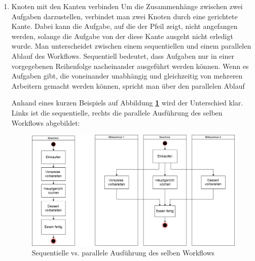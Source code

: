 \begin{enumerate}[font={\bfseries}, label={FA\arabic*}0, wide=0pt, labelindent=1em, leftmargin=*]
            \item  \label{kVerbinden:1} Knoten mit den Kanten verbinden \newline
            Um die Zusammenhänge zwischen zwei Aufgaben darzustellen, verbindet man zwei Knoten durch eine gerichtete Kante. Dabei kann die Aufgabe, auf die der Pfeil zeigt, nicht angefangen werden, solange die Aufgabe von der diese Kante ausgeht nicht erledigt wurde. \newline
            Man unterscheidet zwischen einem sequentiellen und einem parallelen Ablauf des Workflows.\newline
            Sequentiell bedeutet, dass Aufgaben nur in einer vorgegebenen Reihenfolge nacheinander ausgeführt werden können. Wenn es Aufgaben gibt, die voneinander unabhängig und gleichzeitig von mehreren Arbeitern gemacht werden können, spricht man über den parallelen Ablauf \newline
            
            Anhand eines kurzen Beispiels auf Abbildung \textbf{\ref{fig:seqpar}} wird der Unterschied klar. \newline
            Links ist die sequentielle, rechts die parallele Ausführung des selben Workflows abgebildet:
            
            \vspace{1.5cm}
            
            \begin{figure}[h]
                \centering
                \hspace*{-1.7cm}
                \includegraphics[width=18cm]{images/SequentiellParallelBeispiel.png}
                \caption{Sequentielle vs. parallele Ausführung des selben Workflows}
                \label{fig:seqpar}
            \end{figure}
            

\end{enumerate}

